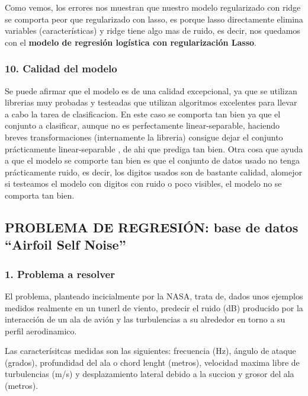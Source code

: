 \documentclass[]{article}
\begin{document}
Como vemos, los errores nos muestran que nuestro modelo regularizado con
ridge se comporta peor que regularizado con lasso, es porque lasso
directamente elimina variables (características) y ridge tiene algo mas
de ruido, es decir, nos quedamos con el \textbf{modelo de regresión
logística con regularización Lasso}.

\subsubsection{10. Calidad del modelo}\label{calidad-del-modelo}

Se puede afirmar que el modelo es de una calidad excepcional, ya que se
utilizan librerias muy probadas y testeadas que utilizan algoritmos
excelentes para llevar a cabo la tarea de clasificacion. En este caso se
comporta tan bien ya que el conjunto a clasificar, aunque no es
perfectamente linear-separable, haciendo breves transformaciones
(internamente la libreria) consigue dejar el conjunto prácticamente
linear-separable , de ahi que prediga tan bien. Otra cosa que ayuda a
que el modelo se comporte tan bien es que el conjunto de datos usado no
tenga prácticamente ruido, es decir, los digitos usados son de bastante
calidad, alomejor si testeamos el modelo con digitos con ruido o poco
visibles, el modelo no se comporta tan bien.

\subsection{\texorpdfstring{PROBLEMA DE REGRESIÓN: base de datos
``Airfoil Self
Noise''}{PROBLEMA DE REGRESIÓN: base de datos Airfoil Self Noise}}\label{problema-de-regresion-base-de-datos-airfoil-self-noise}

\subsubsection{1. Problema a resolver}\label{problema-a-resolver-1}

El problema, planteado incicialmente por la NASA, trata de, dados unos
ejemplos medidos realmente en un tunerl de viento, predecir el ruido
(dB) producido por la interacción de un ala de avión y las turbulencias
a su alrededor en torno a su perfil aerodinamico.

Las caracterísitcas medidas son las siguientes: frecuencia (Hz), ángulo
de ataque (grados), profundidad del ala o chord lenght (metros),
velocidad maxima libre de turbulencias (m/s) y desplazamiento lateral
debido a la succion y grosor del ala (metros).
\end{document}
